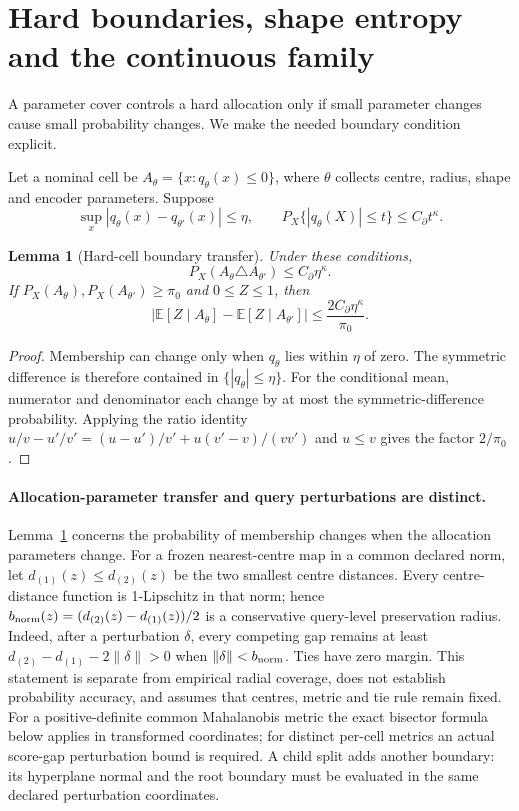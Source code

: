 \documentclass[11pt,a4paper]{article}
\newcommand{\E}{\mathbb E}\newcommand{\Pp}{\mathbb P}
\numberwithin{equation}{section}
\newtheorem{lemma}[theorem]{Lemma}
\theoremstyle{definition}\newtheorem{definition}[theorem]{Definition}
\theoremstyle{remark}\newtheorem{remark}[theorem]{Remark}
\begin{document}
\section{Hard boundaries, shape entropy and the continuous family}\label{sec:shapes}
A parameter cover controls a hard allocation only if small parameter changes cause small probability changes. We make the needed boundary condition explicit.

Let a nominal cell be $A_\theta=\{x:q_\theta(x)\le0\}$, where $\theta$ collects centre, radius, shape and encoder parameters. Suppose
\[
 \sup_x|q_\theta(x)-q_{\theta'}(x)|\le\eta,\qquad
 P_X\{|q_\theta(X)|\le t\}\le C_\partial t^\kappa.
\]

\begin{lemma}[Hard-cell boundary transfer]\label{lem:boundary}
Under these conditions,
\[
 P_X(A_\theta\triangle A_{\theta'})\le C_\partial\eta^\kappa.
\]
If $P_X(A_\theta),P_X(A_{\theta'})\ge\pi_0$ and $0\le Z\le1$, then
\[
 |\E[Z\mid A_\theta]-\E[Z\mid A_{\theta'}]|
 \le\frac{2C_\partial\eta^\kappa}{\pi_0}.
\]
\end{lemma}
\begin{proof}
Membership can change only when $q_\theta$ lies within $\eta$ of zero. The symmetric difference is therefore contained in $\{|q_\theta|\le\eta\}$. For the conditional mean, numerator and denominator each change by at most the symmetric-difference probability. Applying the ratio identity
$u/v-u'/v'=(u-u')/v'+u(v'-v)/(vv')$ and $u\le v$ gives the factor $2/\pi_0$.
\end{proof}

\paragraph{Allocation-parameter transfer and query perturbations are distinct.}
Lemma~\ref{lem:boundary} concerns the probability of membership changes when the allocation parameters change. For a frozen nearest-centre map in a common declared norm, let $d_{(1)}(z)\le d_{(2)}(z)$ be the two smallest centre distances. Every centre-distance function is 1-Lipschitz in that norm; hence $b_{\rm norm}(z)=(d_{(2)}(z)-d_{(1)}(z))/2$ is a conservative query-level preservation radius. Indeed, after a perturbation $\delta$, every competing gap remains at least $d_{(2)}-d_{(1)}-2\|\delta\|>0$ when $\|\delta\|<b_{\rm norm}$. Ties have zero margin. This statement is separate from empirical radial coverage, does not establish probability accuracy, and assumes that centres, metric and tie rule remain fixed. For a positive-definite common Mahalanobis metric the exact bisector formula below applies in transformed coordinates; for distinct per-cell metrics an actual score-gap perturbation bound is required. A child split adds another boundary: its hyperplane normal and the root boundary must be evaluated in the same declared perturbation coordinates.
\end{document}

